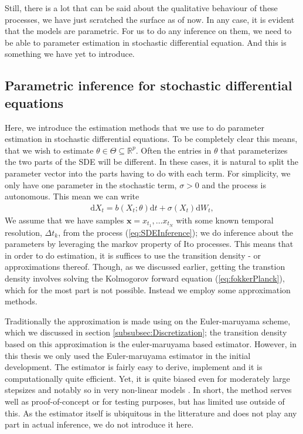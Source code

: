 Still, there is a lot that can be said about the qualitative behaviour of these processes, we have just scratched the surface as of now. In any case, it is evident that the models are parametric. For us to do any inference on them, we need to be able to parameter estimation in stochastic differential equation. And this is something we have yet to introduce.
\subsection{Parametric inference for stochastic differential equations}
Here, we introduce the estimation methods that we use to do parameter estimation in stochastic differential equations. To be completely clear this means, that we wish to estimate $\theta\in\Theta\subseteq\mathbb{R}^p$. Often the entries in $\theta$ that parameterizes the two parts of the SDE will be different. In these cases, it is natural to split the parameter vector into the parts having to do with each term. For simplicity, we only have one parameter in the stochastic term, $\sigma>0$ and the process is autonomous. This mean we can write
\begin{align}
    \mathrm{d}X_t = b(X_t; \theta)\mathrm{d}t + \sigma\left(X_t\right)\mathrm{d}W_t, \label{eq:SDEInference}
\end{align}
We assume that we have samples $\mathbf{x} = x_{t_1},\dots x_{t_N}$ with some known temporal resolution, $\Delta t_k$, from the process (\ref{eq:SDEInference}); we do inference about the parameters by leveraging the markov property of Ito processes. This means that in order to do estimation, it is suffices to use the transition density - or approximations thereof. Though, as we discussed earlier, getting the transtion density involves solving the Kolmogorov forward equation (\ref{eq:fokkerPlanck}), which for the most part is not possible. Instead we employ some approximation methods.

Traditionally the approximation is made using on the Euler-maruyama scheme, which we discussed in section \ref{subsubsec:Discretization}; the transition density based on this approximation is the euler-maruyama based estimator. However, in this thesis we only used the Euler-maruyama estimator in the initial development. The estimator is fairly easy to derive, implement and it is computationally quite efficient. Yet, it is quite biased even for moderately large stepsizes and notably so in very non-linear models \cite{SplittingSchemes}. In short, the method serves well as proof-of-concept or for testing purposes, but has limited use outside of this. As the estimator itself is ubiquitous in the litterature and does not play any part in actual inference, we do not introduce it here.

